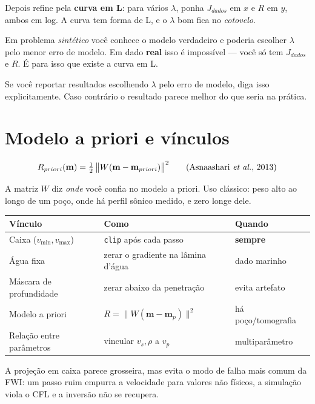 \documentclass[11pt,a4paper,oneside]{report}
\begin{document}
Depois refine pela \textbf{curva em L}: para vários $\lambda$, ponha
$J_{dados}$ em $x$ e $R$ em $y$, ambos em log. A curva tem forma de L, e o
$\lambda$ bom fica no \emph{cotovelo}.

\begin{armadilha}
Em problema \emph{sintético} você conhece o modelo verdadeiro e poderia
escolher $\lambda$ pelo menor erro de modelo. Em dado \textbf{real} isso é
impossível --- você só tem $J_{dados}$ e $R$. É para isso que existe a curva
em L.

Se você reportar resultados escolhendo $\lambda$ pelo erro de modelo, diga
isso explicitamente. Caso contrário o resultado parece melhor do que seria na
prática.
\end{armadilha}

\section{Modelo a priori e vínculos}

\begin{equation}
R_{priori}(\mathbf{m}) = \tfrac{1}{2}\,\bigl\|W(\mathbf{m}-\mathbf{m}_{priori})\bigr\|^{2}
\qquad\text{(Asnaashari \emph{et al.}, 2013)}
\end{equation}

A matriz $W$ diz \emph{onde} você confia no modelo a priori. Uso clássico:
peso alto ao longo de um poço, onde há perfil sônico medido, e zero longe
dele.

\begin{center}
\begin{tabular}{@{}lll@{}}
\toprule
\textbf{Vínculo} & \textbf{Como} & \textbf{Quando} \\
\midrule
Caixa ($v_{\min}, v_{\max}$) & \texttt{clip} após cada passo & \textbf{sempre} \\
Água fixa & zerar o gradiente na lâmina d'água & dado marinho \\
Máscara de profundidade & zerar abaixo da penetração & evita artefato \\
Modelo a priori & $R = \|W(\mathbf{m}-\mathbf{m}_p)\|^{2}$ & há poço/tomografia \\
Relação entre parâmetros & vincular $v_s,\rho$ a $v_p$ & multiparâmetro \\
\bottomrule
\end{tabular}
\end{center}

A projeção em caixa parece grosseira, mas evita o modo de falha mais comum da
FWI: um passo ruim empurra a velocidade para valores não físicos, a simulação
viola o CFL e a inversão não se recupera.
\end{document}

